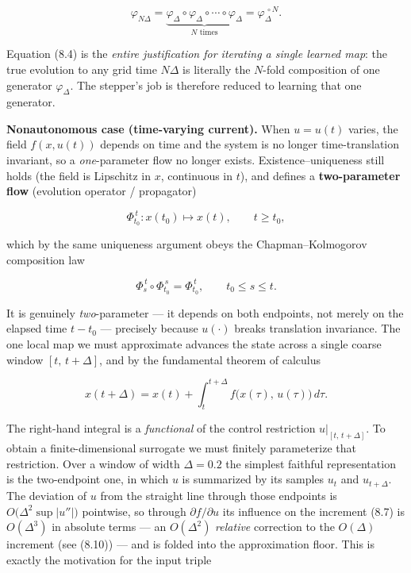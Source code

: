 \documentclass[
  11pt,
]{article}
\begin{document}
\[
\varphi_{N\Delta}=\underbrace{\varphi_{\Delta}\circ\varphi_{\Delta}\circ\cdots\circ\varphi_{\Delta}}_{N\text{ times}}=\varphi_{\Delta}^{\,\circ N}.
\tag{8.4}
\]

Equation (8.4) is the \emph{entire justification for iterating a single
learned map}: the true evolution to any grid time \(N\Delta\) is
literally the \(N\)-fold composition of one generator
\(\varphi_{\Delta}\). The stepper's job is therefore reduced to learning
that one generator.

\textbf{Nonautonomous case (time-varying current).} When \(u=u(t)\)
varies, the field \(f(x,u(t))\) depends on time and the system is no
longer time-translation invariant, so a \emph{one}-parameter flow no
longer exists. Existence--uniqueness still holds (the field is Lipschitz
in \(x\), continuous in \(t\)), and defines a \textbf{two-parameter
flow} (evolution operator / propagator)

\[
\Phi_{t_{0}}^{\,t}:x(t_{0})\longmapsto x(t),\qquad t\ge t_{0},
\tag{8.5}
\]

which by the same uniqueness argument obeys the Chapman--Kolmogorov
composition law

\[
\Phi_{s}^{\,t}\circ\Phi_{t_{0}}^{\,s}=\Phi_{t_{0}}^{\,t},\qquad t_{0}\le s\le t.
\tag{8.6}
\]

It is genuinely \emph{two}-parameter --- it depends on both endpoints,
not merely on the elapsed time \(t-t_{0}\) --- precisely because
\(u(\cdot)\) breaks translation invariance. The one local map we must
approximate advances the state across a single coarse window
\([t,\,t+\Delta]\), and by the fundamental theorem of calculus

\[
x(t+\Delta)=x(t)+\int_{t}^{t+\Delta} f\big(x(\tau),\,u(\tau)\big)\,d\tau .
\tag{8.7}
\]

The right-hand integral is a \emph{functional} of the control
restriction \(u|_{[t,\,t+\Delta]}\). To obtain a finite-dimensional
surrogate we must finitely parameterize that restriction. Over a window
of width \(\Delta=0.2\) the simplest faithful representation is the
two-endpoint one, in which \(u\) is summarized by its samples \(u_{t}\)
and \(u_{t+\Delta}\). The deviation of \(u\) from the straight line
through those endpoints is \(O\!\big(\Delta^{2}\sup|u''|\big)\)
pointwise, so through \(\partial f/\partial u\) its influence on the
increment (8.7) is \(O(\Delta^{3})\) in absolute terms --- an
\(O(\Delta^{2})\) \emph{relative} correction to the \(O(\Delta)\)
increment (see (8.10)) --- and is folded into the approximation floor.
This is exactly the motivation for the input triple
\end{document}
